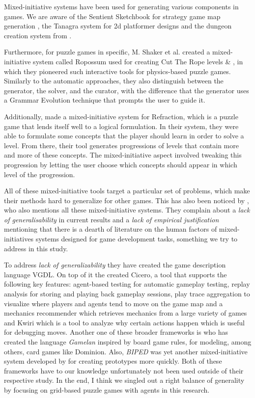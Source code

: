 Mixed-initiative systems have been used for generating various components in games. We are aware of the Sentient Sketchbook for strategy game map generation \cite{Liapis2013}, the Tanagra system for 2d platformer designs  \cite{Smith2011} and the dungeon creation system from \cite{Baldwin2017}.

Furthermore, for puzzle games in specific, M. Shaker et al. created a mixed-initiative system called Ropossum used for creating Cut The Rope levels \cite{Shaker2013} \& \cite{Shaker2013Ropossum}, in which they pioneered such interactive tools for physics-based puzzle games. Similarly to the automatic approaches, they also distinguish between the generator, the solver, and the curator, with the difference that the generator uses a Grammar Evolution technique that prompts the user to guide it.

Additionally, \cite{Butler2013} made a mixed-initiative system for Refraction, which is a puzzle game that lends itself well to a logical formulation. In their system, they were able to formulate some concepts that the player should learn in order to solve a level. From there, their tool generates progressions of levels that contain more and more of these concepts. The mixed-initiative aspect involved tweaking this progression by letting the user choose which concepts should appear in which level of the progression.

All of these mixed-initiative tools target a particular set of problems, which make their methods hard to generalize for other games.
This has also been noticed by \cite{MacHado2018}, who also mentions all these mixed-initiative systems. They complain about a \textit{lack of generalisability} in current results and a \textit{lack of empirical justification} mentioning that there is a dearth of literature on the human factors of mixed-initiatives systems designed for game development tasks, something we try to address in this study.

To address \textit{lack of generalizability} they have created the game description language VGDL. 
On top of it the created Cicero, a tool that supports the following key features: agent-based testing for automatic gameplay testing, replay analysis for storing and playing back gameplay sessions, play trace aggregation to visualize where players and agents tend to move on the game map and a mechanics recommender which retrieves mechanics from a large variety of games and Kwiri which is a tool to analyze why certain actions happen which is useful for debugging moves. 
Another one of these broader frameworks is \cite{Osborn2011} who has created the language \textit{Gamelan} inspired by board game rules, for modeling, among others, card games like Dominion. Also, \textit{BIPED} was yet another mixed-initiative system developed by \cite{Smith2008} for creating prototypes more quickly. Both of these frameworks have to our knowledge unfortunately not been used outside of their respective study.
In the end, I think we singled out a right balance of generality by focusing on grid-based puzzle games with agents in this research.

